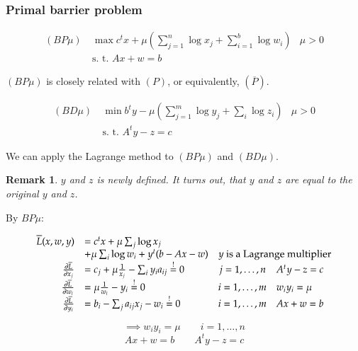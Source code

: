 \documentclass[a4paper]{article}
\numberwithin{lecref}{subsection}
\newtheorem*{Remark}{Remark}
\begin{document}
\subsubsection{Primal barrier problem}

\begin{align*}
	(BP\mu) \: &\max c^t x + \mu \left(\sum_{j=1}^n \log x_j + \sum_{i=1}^b \log w_i\right) & \mu > 0 \\
    &\text{s. t. } Ax + w = b
\end{align*}

$(BP\mu)$ is closely related with $(P)$, or equivalently, $(\overline P)$. 

\begin{align*}
	(BD\mu) \: &\min b^t y - \mu \left(\sum_{j=1}^m \log y_j + \sum_i \log z_i\right) & \mu > 0 \\
	&\text{s. t. } A^t y - z = c
\end{align*}

We can apply the Lagrange method to $(BP\mu)$ and $(BD\mu)$.

\begin{Remark}
	$y$ and $z$ is newly defined. It turns out, that $y$ and $z$ are equal to the original $y$ and $z$.
\end{Remark}

By $BP\mu$:

\[
	\begin{array}{rlcl}
		\overline L(x, w, y) &= c^t x + \mu \sum_j \log x_j & & \\
			&+ \mu \sum_i \log w_i + y^t (b - Ax - w) & \multicolumn{2}{c}{y \text{ is a Lagrange multiplier}} \\
		\frac{\partial \overline L}{\partial x_j} &= c_j + \mu \frac{1}{x_j} - \sum_i y_i a_{ij} \overset!= 0 & j = 1, \dots, n & A^t y - z = c \\
		\frac{\partial \overline L}{\partial w_i} &= \mu \frac{1}{w_i} - y_i \overset!= 0 & i = 1, \dots, m & w_i y_i = \mu \\
		\frac{\partial \overline L}{\partial y_i} &= b_i - \sum_j a_{ij} x_j - w_i \overset!= 0 & i = 1, \dots, m & Ax + w = b
	\end{array}
\]

\[ \implies w_i y_i = \mu \qquad i = 1, \dots, n \]
\[ Ax + w = b \qquad A^t y - z = c \]
\end{document}

